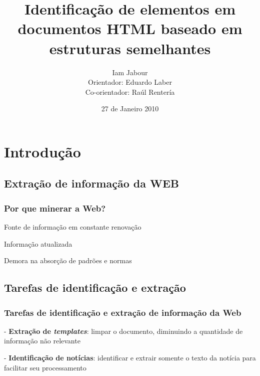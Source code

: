\documentclass{beamer}
\title{Identificação de elementos em documentos HTML baseado em estruturas semelhantes}
\author[Iam Jabour]{Iam Jabour \\ Orientador: Eduardo Laber \\ Co-orientador: Raúl Rentería}
\institute[PUC-Rio]{
  Pontifícia Universidade Católica do Rio de Janeiro \\
}
\date{27 de Janeiro 2010}
\newenvironment{my_itemize}{
\begin{itemize}
  \setlength{\itemsep}{5pt}
  \setlength{\parskip}{2pt}
  \setlength{\parsep}{3pt}
}{\end{itemize}}
\begin{document}
\begin{frame}
  \titlepage
\end{frame}



\section{Introdução}

\subsection{Extração de informação da WEB}
\begin{frame}
\frametitle{Por que minerar a Web?}

  \begin{my_itemize}
  \item Fonte de informação em constante renovação
  \item Informação atualizada
  \item Demora na absorção de padrões e normas
  \end{my_itemize}
\end{frame}

\subsection{Tarefas de identificação e extração}

\begin{frame}
\frametitle{Tarefas de identificação e extração de informação da Web}
  \begin{my_itemize}

    \item[-] {\bf Extração de \textit{templates}}:
    limpar o documento, diminuindo a quantidade de informação não relevante 


    \item[-] {\bf Identificação de notícias}: identificar e extrair
    somente o texto da notícia para facilitar seu processamento 


  \end{my_itemize}
\end{frame}
\end{document}
